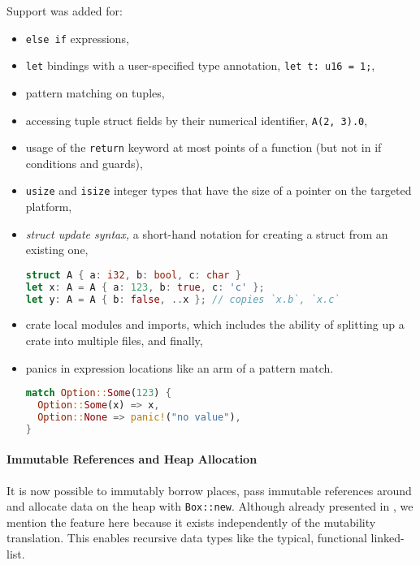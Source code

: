 Support was added for:

\begin{itemize}
\item
  \passthrough{\lstinline!else if!} expressions,
\item
  \passthrough{\lstinline!let!} bindings with a user-specified type
  annotation, \passthrough{\lstinline!let t: u16 = 1;!},
\item
  pattern matching on tuples,
\item
  accessing tuple struct fields by their numerical identifier,
  \passthrough{\lstinline!A(2, 3).0!},
\item
  usage of the \passthrough{\lstinline!return!} keyword at most points
  of a function (but not in if conditions and guards),
\item
  \passthrough{\lstinline!usize!} and \passthrough{\lstinline!isize!}
  integer types that have the size of a pointer on the targeted
  platform,
\item
  \emph{struct update syntax,} a short-hand notation for creating a
  struct from an existing one,

\begin{lstlisting}[language=Rust]
struct A { a: i32, b: bool, c: char }
let x: A = A { a: 123, b: true, c: 'c' };
let y: A = A { b: false, ..x }; // copies `x.b`, `x.c`
\end{lstlisting}
\item
  crate local modules and imports, which includes the ability of
  splitting up a crate into multiple files, and finally,
\item
  panics in expression locations like an arm of a pattern match.

\begin{lstlisting}[language=Rust]
match Option::Some(123) {
  Option::Some(x) => x,
  Option::None => panic!("no value"),
}
\end{lstlisting}
\end{itemize}

\paragraph{Immutable References and Heap Allocation}

It is now possible to immutably borrow places, pass immutable references
around and allocate data on the heap with
\passthrough{\lstinline!Box::new!}. Although already presented in
, we mention the feature here because it exists
independently of the mutability translation. This enables recursive data
types like the typical, functional linked-list.

